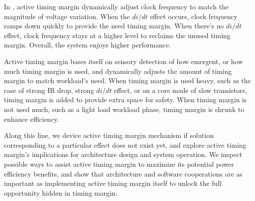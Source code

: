 In , active timing margin dynamically adjust clock frequency to match the magnitude of voltage variation. When the $di/dt$ effect occurs, clock frequency ramps down quickly to provide the need timing margin. When there's no $di/dt$ effect, clock frequency stays at a higher level to reclaims the unused timing margin. Overall, the system enjoys higher performance.

Active timing margin bases itself on sensory detection of how emergent, or how much timing margin is used, and dynamically adjusts the amount of timing margin to match workload's need. When timing margin is used heavy, such as the case of strong IR drop, strong $di/dt$ effect, or on a core made of slow transistors, timing margin is added to provide extra space for safety. When timing margin is not used much, such as a light load workload phase, timing margin is shrunk to enhance efficiency. 

Along this line, we device active timing margin mechanism if solution corresponding to a particular effect does not exist yet, and explore active timing margin's implications for architecture design and system operation. We inspect possible ways to assist active timing margin to maximize its potential power efficiency benefits, and show that architecture and software cooperations are as important as implementing active timing margin itself to unlock the full opportunity hidden in timing margin.

